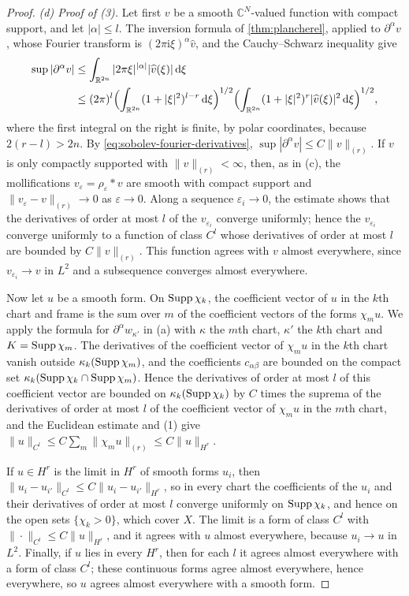 \begin{proof}
\emph{(d) Proof of (3).} Let first $v$ be a smooth $\mathbb C^N$-valued function with compact support, and let $|\alpha|\leq l$. The inversion formula of \cref{thm:plancherel}, applied to $\partial^\alpha v$, whose Fourier transform is $(2\pi\mathrm i\xi)^\alpha\widehat v$, and the Cauchy--Schwarz inequality give
\[
 \begin{aligned}
 \sup|\partial^\alpha v|&\leq\int_{\mathbb R^{2n}}|2\pi\xi|^{|\alpha|}|\widehat v(\xi)|\,\mathrm d\xi\\
 &\leq(2\pi)^l\Bigl(\int_{\mathbb R^{2n}}(1+|\xi|^2)^{l-r}\,\mathrm d\xi\Bigr)^{1/2}\Bigl(\int_{\mathbb R^{2n}}(1+|\xi|^2)^r|\widehat v(\xi)|^2\,\mathrm d\xi\Bigr)^{1/2},
 \end{aligned}
\]
where the first integral on the right is finite, by polar coordinates, because $2(r-l)>2n$. By \eqref{eq:sobolev-fourier-derivatives}, $\sup|\partial^\alpha v|\leq C\|v\|_{(r)}$. If $v$ is only compactly supported with $\|v\|_{(r)}<\infty$, then, as in (c), the mollifications $v_\varepsilon=\rho_\varepsilon*v$ are smooth with compact support and $\|v_\varepsilon-v\|_{(r)}\to0$ as $\varepsilon\to0$. Along a sequence $\varepsilon_i\to0$, the estimate shows that the derivatives of order at most $l$ of the $v_{\varepsilon_i}$ converge uniformly; hence the $v_{\varepsilon_i}$ converge uniformly to a function of class $C^l$ whose derivatives of order at most $l$ are bounded by $C\|v\|_{(r)}$. This function agrees with $v$ almost everywhere, since $v_{\varepsilon_i}\to v$ in $L^2$ and a subsequence converges almost everywhere.

Now let $u$ be a smooth form. On $\operatorname{Supp}\chi_k$, the coefficient vector of $u$ in the $k$th chart and frame is the sum over $m$ of the coefficient vectors of the forms $\chi_mu$. We apply the formula for $\partial^\alpha w_{\kappa'}$ in (a) with $\kappa$ the $m$th chart, $\kappa'$ the $k$th chart and $K=\operatorname{Supp}\chi_m$. The derivatives of the coefficient vector of $\chi_mu$ in the $k$th chart vanish outside $\kappa_k(\operatorname{Supp}\chi_m)$, and the coefficients $c_{\alpha\beta}$ are bounded on the compact set $\kappa_k(\operatorname{Supp}\chi_k\cap\operatorname{Supp}\chi_m)$. Hence the derivatives of order at most $l$ of this coefficient vector are bounded on $\kappa_k(\operatorname{Supp}\chi_k)$ by $C$ times the suprema of the derivatives of order at most $l$ of the coefficient vector of $\chi_mu$ in the $m$th chart, and the Euclidean estimate and (1) give $\|u\|_{C^l}\leq C\sum_m\|\chi_mu\|_{(r)}\leq C\|u\|_{H^r}$.

If $u\in H^r$ is the limit in $H^r$ of smooth forms $u_i$, then $\|u_i-u_{i'}\|_{C^l}\leq C\|u_i-u_{i'}\|_{H^r}$, so in every chart the coefficients of the $u_i$ and their derivatives of order at most $l$ converge uniformly on $\operatorname{Supp}\chi_k$, and hence on the open sets $\{\chi_k>0\}$, which cover $X$. The limit is a form of class $C^l$ with $\|\cdot\|_{C^l}\leq C\|u\|_{H^r}$, and it agrees with $u$ almost everywhere, because $u_i\to u$ in $L^2$. Finally, if $u$ lies in every $H^r$, then for each $l$ it agrees almost everywhere with a form of class $C^l$; these continuous forms agree almost everywhere, hence everywhere, so $u$ agrees almost everywhere with a smooth form.


\end{proof}
